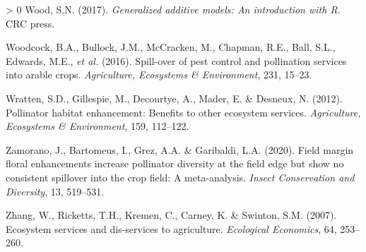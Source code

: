 \documentclass[]{elsarticle} %
\newlength{\cslhangindent}
\newenvironment{CSLReferences}[3] %
 {%
  \setlength{\parindent}{0pt}
  \ifodd #1 \everypar{\setlength{\hangindent}{\cslhangindent}}\ignorespaces\fi
  \ifnum #2 > 0
  \setlength{\parskip}{#2\baselineskip}
  \fi
 }%
 {}
\begin{document}
\begin{CSLReferences}{1}{0}
\leavevmode\hypertarget{ref-wood2017}{}%
Wood, S.N. (2017). \emph{Generalized additive models: An introduction with {R}}. CRC press.

\leavevmode\hypertarget{ref-woodcock2016}{}%
Woodcock, B.A., Bullock, J.M., McCracken, M., Chapman, R.E., Ball, S.L., Edwards, M.E., \emph{et al.} (2016). Spill-over of pest control and pollination services into arable crops. \emph{Agriculture, Ecosystems \& Environment}, 231, 15--23.

\leavevmode\hypertarget{ref-wratten2012}{}%
Wratten, S.D., Gillespie, M., Decourtye, A., Mader, E. \& Desneux, N. (2012). Pollinator habitat enhancement: Benefits to other ecosystem services. \emph{Agriculture, Ecosystems {\&} Environment}, 159, 112--122.

\leavevmode\hypertarget{ref-zamorano2020}{}%
Zamorano, J., Bartomeus, I., Grez, A.A. \& Garibaldi, L.A. (2020). Field margin floral enhancements increase pollinator diversity at the field edge but show no consistent spillover into the crop field: A meta-analysis. \emph{Insect Conservation and Diversity}, 13, 519--531.

\leavevmode\hypertarget{ref-zhang2007}{}%
Zhang, W., Ricketts, T.H., Kremen, C., Carney, K. \& Swinton, S.M. (2007). Ecosystem services and dis-services to agriculture. \emph{Ecological Economics}, 64, 253--260.

\end{CSLReferences}
\end{document}
